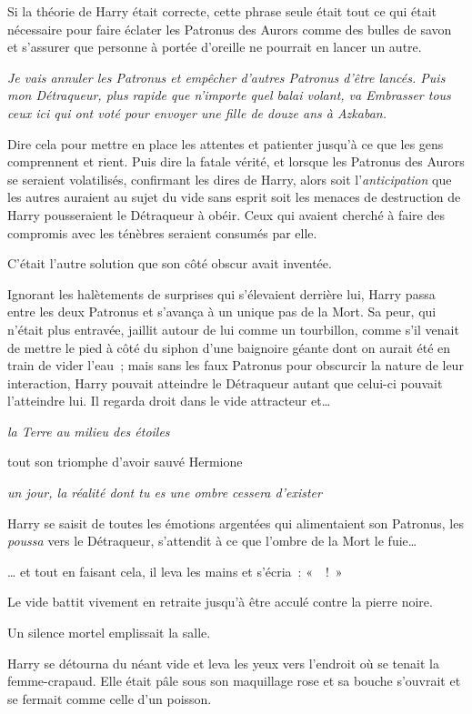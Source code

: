 Si la théorie de Harry était correcte, cette phrase seule était tout ce qui était nécessaire pour faire éclater les Patronus des Aurors comme des bulles de savon et s'assurer que personne à portée d'oreille ne pourrait en lancer un autre.

\emph{Je vais annuler les Patronus et empêcher d'autres Patronus d'être lancés. Puis mon Détraqueur, plus rapide que n'importe quel balai volant, va Embrasser tous ceux ici qui ont voté pour envoyer une fille de douze ans à Azkaban.}

Dire cela pour mettre en place les attentes et patienter jusqu'à ce que les gens comprennent et rient. Puis dire la fatale vérité, et lorsque les Patronus des Aurors se seraient volatilisés, confirmant les dires de Harry, alors soit l'\emph{anticipation} que les autres auraient au sujet du vide sans esprit soit les menaces de destruction de Harry pousseraient le Détraqueur à obéir. Ceux qui avaient cherché à faire des compromis avec les ténèbres seraient consumés par elle.

C'était l'autre solution que son côté obscur avait inventée.

Ignorant les halètements de surprises qui s'élevaient derrière lui, Harry passa entre les deux Patronus et s'avança à un unique pas de la Mort. Sa peur, qui n'était plus entravée, jaillit autour de lui comme un tourbillon, comme s'il venait de mettre le pied à côté du siphon d'une baignoire géante dont on aurait été en train de vider l'eau~; mais sans les faux Patronus pour obscurcir la nature de leur interaction, Harry pouvait atteindre le Détraqueur autant que celui-ci pouvait l'atteindre lui. Il regarda droit dans le vide attracteur et…

\emph{la Terre au milieu des étoiles}

tout son triomphe d'avoir sauvé Hermione

\emph{un jour, la réalité dont tu es une ombre cessera d'exister}

Harry se saisit de toutes les émotions argentées qui alimentaient son Patronus, les \emph{poussa} vers le Détraqueur, s'attendit à ce que l'ombre de la Mort le fuie…

… et tout en faisant cela, il leva les mains et s'écria~: «~~!~»

Le vide battit vivement en retraite jusqu'à être acculé contre la pierre noire.

Un silence mortel emplissait la salle.

Harry se détourna du néant vide et leva les yeux vers l'endroit où se tenait la femme-crapaud. Elle était pâle sous son maquillage rose et sa bouche s'ouvrait et se fermait comme celle d'un poisson.

